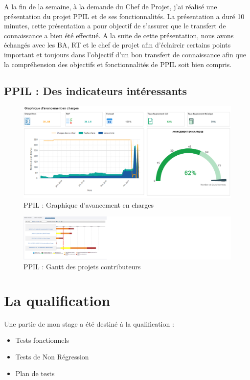 A la fin de la semaine, à la demande du Chef de Projet, j'ai réalisé une présentation du projet PPIL et de ses fonctionnalités. La présentation a duré 10 minutes, cette présentation a pour objectif de s'assurer que le transfert de connaissance a bien été effectué. A la suite de cette présentation, nous avons échangés avec les BA, RT et le chef de projet afin d'éclaircir certains points important et toujours dans l'objectif d'un bon transfert de connaissance afin que la compréhension des objectifs et fonctionnalités de PPIL soit bien compris.

\subsection{PPIL : Des indicateurs intéressants}

\begin{figure}[!h]
\centering
\includegraphics[width=1\textwidth]{images/PPIL-avancement.png}
\caption{PPIL : Graphique d'avancement en charges}
\end{figure}


\begin{figure}[!h]
\centering
\includegraphics[width=2.5\textwidth]{images/PPIL-Gantt.png}
\caption{PPIL : Gantt des projets contributeurs}
\end{figure}


\section{La qualification}

Une partie de mon stage a été destiné à la qualification : 
\begin{itemize}
    \item Tests fonctionnels
    \item Tests de Non Régression
    \item Plan de tests
\end{itemize}

